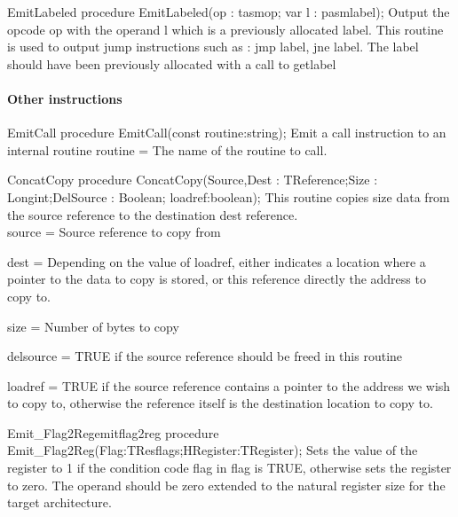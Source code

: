 \documentclass [a4paper,12pt]{article}
\begin{document}
\begin{procedure}{EmitLabeled}
\Declaration
procedure EmitLabeled(op : tasmop; var l : pasmlabel);
\Description
Output the opcode \textsf{op }with the operand \textsf{l}
which is a previously allocated label.
\Notes
This routine is used to output jump instructions such as : jmp label, jne
label.  The label should have been previously allocated with a call to
\textsf{getlabel}

\end{procedure}

\paragraph{Other instructions}

\begin{function}{EmitCall}
\Declaration
procedure EmitCall(const routine:string);
\Description
Emit a call instruction to an internal routine
\Parameters
routine = The name of the routine to call.
\end{function}

\begin{procedure}{ConcatCopy}
\Declaration
procedure ConcatCopy(Source,Dest : TReference;Size : Longint;DelSource : Boolean; loadref:boolean);
\Description
This routine copies \textsf{size} data from the \textsf{source} reference to the destination \textsf{dest} reference. \\
\Parameters
source = Source reference to copy from \par
dest = Depending on the value of loadref, either indicates a location where a
pointer to the data to copy is stored, or this reference directly the address
to copy to. \par
size = Number of bytes to copy \par delsource = TRUE if the source reference
should be freed in this routine \par loadref = TRUE if the source reference
contains a pointer to the address we wish to copy to, otherwise the reference
itself is the destination location to copy to.
\end{procedure}

\begin{procedurel}{Emit{\_}Flag2Reg}{emitflag2reg}
\Declaration
procedure Emit{\_}Flag2Reg(Flag:TResflags;HRegister:TRegister);
\Description
Sets the value of the register to 1 if the condition code flag in \textsf{flag}
is TRUE, otherwise sets the register to zero.
\Notes
The operand should be zero extended to the natural register size for the
target architecture.
\end{procedurel}
\end{document}
